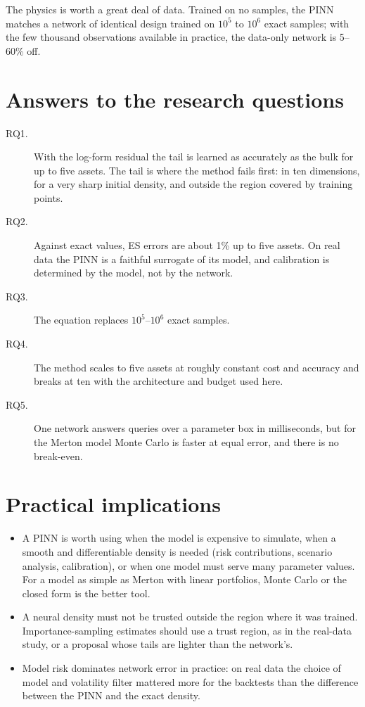 The physics is worth a great deal of data. Trained on no samples, the PINN matches a network of identical design
trained on $10^5$ to $10^6$ exact samples; with the few thousand observations available in practice, the data-only
network is 5--60\% off.

\section{Answers to the research questions}
\begin{description}
  \item[RQ1.] With the log-form residual the tail is learned as accurately as the bulk for up to five assets. The tail
    is where the method fails first: in ten dimensions, for a very sharp initial density, and outside the region
    covered by training points.
  \item[RQ2.] Against exact values, ES errors are about 1\% up to five assets. On real data the PINN is a faithful
    surrogate of its model, and calibration is determined by the model, not by the network.
  \item[RQ3.] The equation replaces $10^5$--$10^6$ exact samples.
  \item[RQ4.] The method scales to five assets at roughly constant cost and accuracy and breaks at ten with the
    architecture and budget used here.
  \item[RQ5.] One network answers queries over a parameter box in milliseconds, but for the Merton model Monte Carlo
    is faster at equal error, and there is no break-even.
\end{description}

\section{Practical implications}
\begin{itemize}
  \item A PINN is worth using when the model is expensive to simulate, when a smooth and differentiable density is
    needed (risk contributions, scenario analysis, calibration), or when one model must serve many parameter
    values. For a model as simple as Merton with linear portfolios, Monte Carlo or the closed form is the better tool.
  \item A neural density must not be trusted outside the region where it was trained. Importance-sampling estimates
    should use a trust region, as in the real-data study, or a proposal whose tails are lighter than the network's.
  \item Model risk dominates network error in practice: on real data the choice of model and volatility filter
    mattered more for the backtests than the difference between the PINN and the exact density.
\end{itemize}


